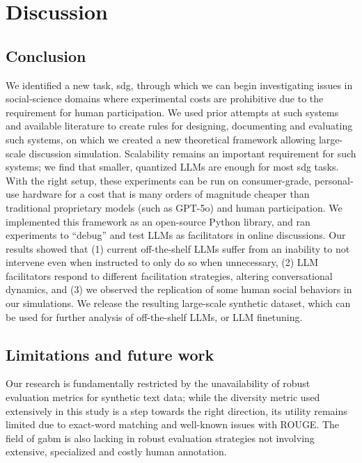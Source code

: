 \section{Discussion}

\subsection{Conclusion}
\label{sec:discussion:conclusion}

We identified a new task, \acf{sdg}, through which we can begin investigating issues in social-science domains where experimental costs are prohibitive due to the requirement for human participation. We used prior attempts at such systems and available literature to create rules for designing, documenting and evaluating such systems, on which we created a new theoretical framework allowing large-scale discussion simulation. Scalability remains an important requirement for such systems; we find that smaller, quantized LLMs are enough for most \ac{sdg} tasks. With the right setup, these experiments can be run on consumer-grade, personal-use hardware for a cost that is many orders of magnitude cheaper than traditional proprietary models (such as GPT-5o) and human participation. We implemented this framework as an open-source Python library, and ran experiments to ``debug'' and test LLMs as facilitators in online discussions. Our results showed that (1) current off-the-shelf LLMs suffer from an inability to not intervene even when instructed to only do so when unnecessary, (2) LLM facilitators respond to different facilitation strategies, altering conversational dynamics, and (3) we observed the replication of some human social behaviors in our simulations. We release the resulting large-scale synthetic dataset, which can be used for further analysis of off-the-shelf LLMs, or LLM finetuning.


\subsection{Limitations and future work}
\label{sec:discussion:future-work}

Our research is fundamentally restricted by the unavailability of robust evaluation metrics for synthetic text data; while the diversity metric used extensively in this study is a step towards the right direction, its utility remains limited due to exact-word matching and well-known issues with ROUGE. The field of \ac{gabm} is also lacking in robust evaluation strategies not involving extensive, specialized and costly human annotation.


